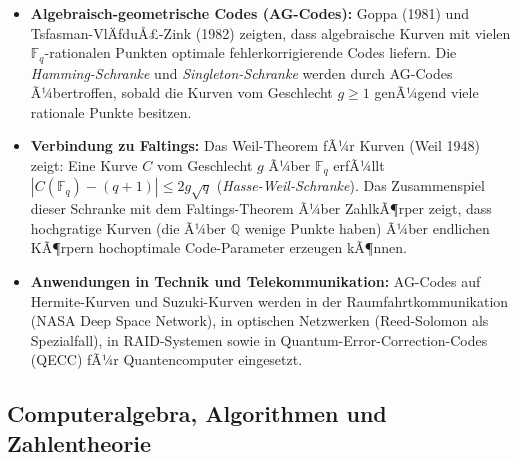 ﻿\documentclass[12pt,a4paper]{article}
\theoremstyle{plain}
\theoremstyle{definition}
\theoremstyle{remark}
\newcommand{\Q}{\mathbb{Q}}
\newcommand{\F}{\mathbb{F}}
\begin{document}
\begin{itemize}[leftmargin=2em,itemsep=4pt]
  \item \textbf{Algebraisch-geometrische Codes (AG-Codes):}
    Goppa (1981) und Tsfasman-VlÄƒduÅ£-Zink (1982) zeigten, dass algebraische Kurven
    mit vielen $\F_q$-rationalen Punkten optimale fehlerkorrigierende Codes liefern.
    Die \emph{Hamming-Schranke} und \emph{Singleton-Schranke} werden durch
    AG-Codes Ã¼bertroffen, sobald die Kurven vom Geschlecht $g \geq 1$ genÃ¼gend
    viele rationale Punkte besitzen.

  \item \textbf{Verbindung zu Faltings:}
    Das Weil-Theorem fÃ¼r Kurven (Weil 1948) zeigt: Eine Kurve $C$ vom Geschlecht $g$
    Ã¼ber $\F_q$ erfÃ¼llt $|C(\F_q) - (q+1)| \leq 2g\sqrt{q}$ (\emph{Hasse-Weil-Schranke}).
    Das Zusammenspiel dieser Schranke mit dem Faltings-Theorem Ã¼ber ZahlkÃ¶rper
    zeigt, dass hochgratige Kurven (die Ã¼ber $\Q$ wenige Punkte haben)
    Ã¼ber endlichen KÃ¶rpern hochoptimale Code-Parameter erzeugen kÃ¶nnen.

  \item \textbf{Anwendungen in Technik und Telekommunikation:}
    AG-Codes auf Hermite-Kurven und Suzuki-Kurven werden in der
    Raumfahrtkommunikation (NASA Deep Space Network), in optischen Netzwerken
    (Reed-Solomon als Spezialfall), in RAID-Systemen sowie in Quantum-Error-Correction-Codes
    (QECC) fÃ¼r Quantencomputer eingesetzt.
\end{itemize}

\subsection{Computeralgebra, Algorithmen und Zahlentheorie}
\end{document}
